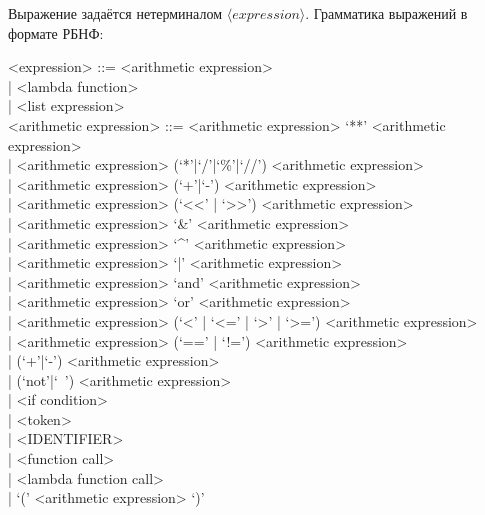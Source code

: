 \documentclass[12pt,a4paper,oneside]{extarticle}
\begin{document}
            Выражение задаётся нетерминалом $\langle expression \rangle$. Грамматика выражений в формате РБНФ:
            \begin{grammar}
                <expression> ::=
                      <arithmetic expression> \\
                    | <lambda function> \\
                    | <list expression> \\

                <arithmetic expression> ::=
                      <arithmetic expression> `**' <arithmetic expression> \\
                    | <arithmetic expression> (`*'|`/'|`\%'|`//') <arithmetic expression> \\
                    | <arithmetic expression> (`+'|`-') <arithmetic expression> \\
                    | <arithmetic expression> (`\textless\null\textless' | `\textgreater\null\textgreater') <arithmetic expression> \\
                    | <arithmetic expression> `&' <arithmetic expression> \\
                    | <arithmetic expression> `^' <arithmetic expression> \\
                    | <arithmetic expression> `|' <arithmetic expression> \\
                    | <arithmetic expression> `and' <arithmetic expression> \\
                    | <arithmetic expression> `or' <arithmetic expression> \\
                    | <arithmetic expression> (`\textless' | `\textless=' | `\textgreater' | `\textgreater=') <arithmetic expression> \\
                    | <arithmetic expression> (`==' | `!=') <arithmetic expression> \\
                    | (`+'|`-') <arithmetic expression> \\
                    | (`not'|`~') <arithmetic expression> \\
                    | <if condition> \\
                    | <token> \\
                    | <IDENTIFIER> \\
                    | <function call> \\
                    | <lambda function call> \\
                    | `(' <arithmetic expression> `)'
            \end{grammar}
\end{document}

